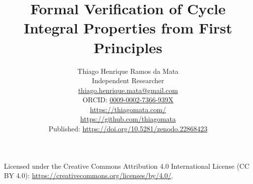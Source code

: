 \documentclass[11pt]{article}
\title{Formal Verification of Cycle Integral Properties from First Principles}
\author{%
  Thiago Henrique Ramos da Mata\\
  \small Independent Researcher\\
  \small \href{mailto:thiago.henrique.mata@gmail.com}{thiago.henrique.mata@gmail.com}\\
  \small ORCID: \href{https://orcid.org/0009-0002-7366-939X}{0009-0002-7366-939X}\\
  \small \url{https://thiagomata.com/}\\
  \small \url{https://github.com/thiagomata}\\
  \small Published: \url{https://doi.org/10.5281/zenodo.22868423}
}
\date{}
\begin{document}
\maketitle



\begin{center}
  \small Licensed under the Creative Commons Attribution 4.0 International
  License (CC BY 4.0): \url{https://creativecommons.org/licenses/by/4.0/}.
\end{center}


















\appendix

\end{document}
